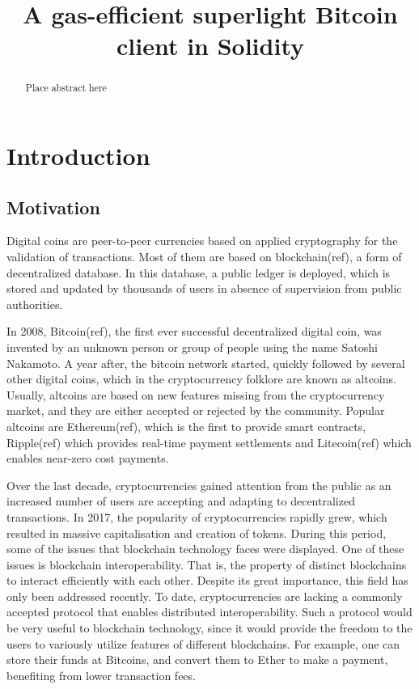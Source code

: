 \documentclass{article}
\title{A gas-efficient superlight Bitcoin client in Solidity}
\begin{document}
  \maketitle

  \begin{abstract}
    Place abstract here
  \end{abstract}

  \section{Introduction}

  \subsection{Motivation}

  Digital coins are peer-to-peer currencies based on applied
  cryptography for the validation of transactions. Most of them are
  based on blockchain(ref), a form of decentralized database. In this
  database, a public ledger is deployed, which is stored and updated by
  thousands of users in absence of supervision from public authorities.

  In 2008, Bitcoin(ref), the first ever successful decentralized digital
  coin, was invented by an unknown person or group of people using the
  name Satoshi Nakamoto. A year after, the bitcoin network started,
  quickly followed by several other digital coins, which in the
  cryptocurrency folklore are known as altcoins. Usually, altcoins are
  based on new features missing from the cryptocurrency market, and they
  are either accepted or rejected by the community. Popular altcoins are
  Ethereum(ref), which is the first to provide smart contracts,
  Ripple(ref) which provides real-time payment settlements and
  Litecoin(ref) which enables near-zero cost payments.

  Over the last decade, cryptocurrencies gained attention from the
  public as an increased number of users are accepting and adapting to
  decentralized transactions. In 2017, the popularity of
  cryptocurrencies rapidly grew, which resulted in massive
  capitalisation and creation of tokens. During this period, some of the
  issues that blockchain technology faces were displayed. One of these
  issues is blockchain interoperability. That is, the property of
  distinct blockchains to interact efficiently with each other. Despite
  its great importance, this field has only been addressed recently. To
  date, cryptocurrencies are lacking a commonly accepted protocol that
  enables distributed interoperability. Such a protocol would be very
  useful to blockchain technology, since it would provide the freedom to
  the users to variously utilize features of different blockchains. For
  example, one can store their funds at Bitcoins, and convert them to
  Ether to make a payment, benefiting from lower transaction fees.
\end{document}
